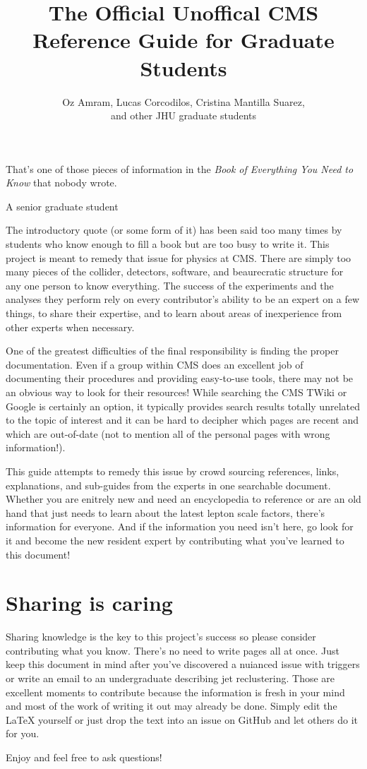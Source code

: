 \documentclass{article}
\begin{document}
\title{The Official Unoffical CMS Reference Guide for Graduate Students}
\author{Oz Amram, Lucas Corcodilos, Cristina Mantilla Suarez,\\ and other JHU graduate students}

\maketitle

\epigraph{That's one of those pieces of information in the \textit{Book of Everything You Need to Know} that nobody wrote.}{A senior graduate student}

The introductory quote (or some form of it) has been said too many times by students who know enough to fill a book but are too busy to write it. This project is meant to remedy that issue for physics at CMS. There are simply too many pieces of the collider, detectors, software, and beaurecratic structure for any one person to know everything. The success of the experiments and the analyses they perform rely on every contributor's ability to be an expert on a few things, to share their expertise, and to learn about areas of inexperience from other experts when necessary. 

One of the greatest difficulties of the final responsibility is finding the proper documentation. Even if a group within CMS does an excellent job of documenting their procedures and providing easy-to-use tools, there may not be an obvious way to look for their resources! While searching the CMS TWiki or Google is certainly an option, it typically provides search results totally unrelated to the topic of interest and it can be hard to decipher which pages are recent and which are out-of-date (not to mention all of the personal pages with wrong information!). 

This guide attempts to remedy this issue by crowd sourcing references, links, explanations, and sub-guides from the experts in one searchable document. Whether you are enitrely new and need an encyclopedia to reference or are an old hand that just needs to learn about the latest lepton scale factors, there's information for everyone. And if the information you need isn't here, go look for it and become the new resident expert by contributing what you've learned to this document! 

\section*{Sharing is caring}
Sharing knowledge is the key to this project's success so please consider contributing what you know. There's no need to write pages all at once. Just keep this document in mind after you've discovered a nuianced issue with triggers or write an email to an undergraduate describing jet reclustering. Those are excellent moments to contribute because the information is fresh in your mind and most of the work of writing it out may already be done. Simply edit the LaTeX yourself or just drop the text into an issue on GitHub and let others do it for you.

Enjoy and feel free to ask questions!

\clearpage





\clearpage
\printglossary
\end{document}
